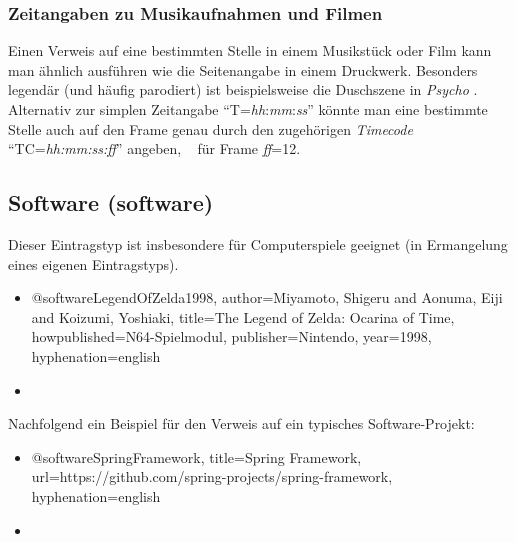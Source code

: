 \subsubsection{Zeitangaben zu Musikaufnahmen und Filmen} 

Einen Verweis auf eine bestimmten Stelle in einem Musikstück oder Film kann man 
ähnlich ausführen wie die Seitenangabe in einem Druckwerk.
Besonders legendär (und häufig parodiert) ist beispielsweise die Duschszene
in \emph{Psycho} \cite[T=00:32:10]{Psycho1960}.
Alternativ zur simplen Zeitangabe "`T=\emph{hh}:\emph{mm}:\emph{ss}"' 
könnte man eine bestimmte Stelle auch auf den Frame genau durch 
den zugehörigen \emph{Timecode} "`TC=\emph{hh:mm:ss:ff}"' angeben, 
\zB\ \cite[TC=00:32:10:12]{Psycho1960} für Frame \emph{ff}=12.



\subsection{Software (\textsf{software})}
\label{sec:@software}



Dieser Eintragstyp ist insbesondere für Computerspiele geeignet (in Ermangelung
eines eigenen Eintragstyps).
%
\begin{itemize}
\item[] 
\begin{GenericCode}[numbers=none]
@software{LegendOfZelda1998,
  author={Miyamoto, Shigeru and Aonuma, Eiji and Koizumi, Yoshiaki},
  title={The Legend of Zelda: Ocarina of Time},
  howpublished={N64-Spielmodul},
  publisher={Nintendo},
  year={1998},
  hyphenation={english}
}
\end{GenericCode}
\item[\cite{LegendOfZelda1998}] 
\end{itemize}

\noindent
Nachfolgend ein Beispiel für den Verweis auf ein typisches Software-Projekt:
%
\begin{itemize}
\item[] 
\begin{GenericCode}[numbers=none]
@software{SpringFramework,
	title={Spring Framework},
	url={https://github.com/spring-projects/spring-framework},
	hyphenation={english}
}
\end{GenericCode}
\item[\cite{SpringFramework}] 
\end{itemize}




